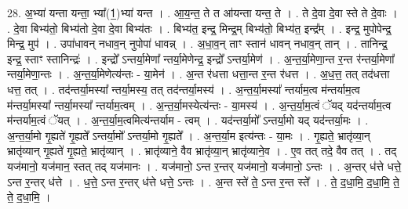 \documentclass[17pt]{extarticle}
\begin{document}
28. अ॒भ्या॑ यन्ता यन्ता॒ भ्या᳚(1॒)भ्या॑ यन्त । . आ॒य॒न्त॒ ते त आ॑यन्ता यन्त॒ ते । . ते दे॒वा दे॒वा स्ते ते दे॒वाः । . दे॒वा बिभ्य॑तो॒ बिभ्य॑तो दे॒वा दे॒वा बिभ्य॑तः । . बिभ्य॑त॒ इन्द्र॒ मिन्द्र॒म् बिभ्य॑तो॒ बिभ्य॑त॒ इन्द्र᳚म् । . इन्द्र॒ मुपोपेन्द्र॒ मिन्द्र॒ मुप॑ । . उपा॑धावन् नधाव॒न् नुपोपा॑ धावन्न् । . अ॒धा॒व॒न् ताꣳ स्तान॑ धावन् नधाव॒न् तान् । . तानिन्द्र॒ इन्द्र॒ स्ताꣳ स्तानिन्द्रः॑ । . इन्द्रो᳚ ऽन्तर्या॒मेणा᳚ न्तर्या॒मेणेन्द्र॒ इन्द्रो᳚ ऽन्तर्या॒मेण॑ । . अ॒न्त॒र्या॒मेणा॒न्त र॒न्त र॑न्तर्या॒मेणा᳚ न्तर्या॒मेणा॒न्तः । . अ॒न्त॒र्या॒मेणेत्य॑न्तः - या॒मेन॑ । . अ॒न्त र॑धत्ता धत्ता॒न्त र॒न्त र॑धत्त । . अ॒ध॒त्त॒ तत् तद॑धत्ता धत्त॒ तत् । . तद॑न्तर्या॒मस्या᳚ न्तर्या॒मस्य॒ तत् तद॑न्तर्या॒मस्य॑ । . अ॒न्त॒र्या॒मस्या᳚ न्तर्याम॒त्व म॑न्तर्याम॒त्व म॑न्तर्या॒मस्या᳚ न्तर्या॒मस्या᳚ न्तर्याम॒त्वम् । . अ॒न्त॒र्या॒मस्येत्य॑न्तः - या॒मस्य॑ । . अ॒न्त॒र्या॒म॒त्वं ॅयद् यद॑न्तर्याम॒त्व म॑न्तर्याम॒त्वं ॅयत् । . अ॒न्त॒र्या॒म॒त्वमित्य॑न्तर्याम - त्वम् । . यद॑न्तर्या॒मो᳚ ऽन्तर्या॒मो यद् यद॑न्तर्या॒मः । . अ॒न्त॒र्या॒मो गृ॒ह्यते॑ गृ॒ह्यते᳚ ऽन्तर्या॒मो᳚ ऽन्तर्या॒मो गृ॒ह्यते᳚ । . अ॒न्त॒र्या॒म इत्य॑न्तः - या॒मः । . गृ॒ह्यते॒ भ्रातृ॑व्या॒न् भ्रातृ॑व्यान् गृ॒ह्यते॑ गृ॒ह्यते॒ भ्रातृ॑व्यान् । . भ्रातृ॑व्याने॒ वैव भ्रातृ॑व्या॒न् भ्रातृ॑व्याने॒व । . ए॒व तत् तदे॒ वैव तत् । . तद् यज॑मानो॒ यज॑मान॒ स्तत् तद् यज॑मानः । . यज॑मानो॒ ऽन्त र॒न्तर् यज॑मानो॒ यज॑मानो॒ ऽन्तः । . अ॒न्तर् ध॑त्ते धत्ते॒ ऽन्त र॒न्तर् ध॑त्ते । . ध॒त्ते॒ ऽन्त र॒न्तर् ध॑त्ते धत्ते॒ ऽन्तः । . अ॒न्त स्ते॑ ते॒ ऽन्त र॒न्त स्ते᳚ । . ते॒ द॒धा॒मि॒ द॒धा॒मि॒ ते॒ ते॒ द॒धा॒मि॒ । \newline
\end{document}
